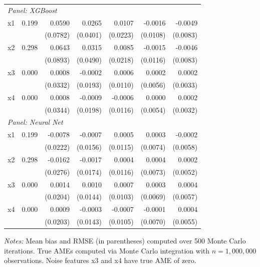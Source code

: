 \documentclass[12pt,a4paper]{article}
\numberwithin{equation}{section}
\theoremstyle{plain}
\theoremstyle{definition}
\begin{document}
\begin{table}[htbp]
\begin{threeparttable}
\begin{tabular}{lrrrrrr}
				\multicolumn{7}{l}{\textit{Panel: XGBoost}} \\
				\quad x1 & 0.199 & 0.0590 & 0.0265 & 0.0107 & -0.0016 & -0.0049 \\
				&  & (0.0782) & (0.0401) & (0.0223) & (0.0108) & (0.0083) \\
				\quad x2 & 0.298 & 0.0643 & 0.0315 & 0.0085 & -0.0015 & -0.0046 \\
				&  & (0.0893) & (0.0490) & (0.0218) & (0.0116) & (0.0083) \\
				\quad x3 & 0.000 & 0.0008 & -0.0002 & 0.0006 & 0.0002 & 0.0002 \\
				&  & (0.0332) & (0.0193) & (0.0110) & (0.0056) & (0.0033) \\
				\quad x4 & 0.000 & 0.0008 & -0.0009 & -0.0006 & 0.0000 & 0.0002 \\
				&  & (0.0344) & (0.0198) & (0.0116) & (0.0054) & (0.0032) \\
				\midrule
				\multicolumn{7}{l}{\textit{Panel: Neural Net}} \\
				\quad x1 & 0.199 & -0.0078 & -0.0007 & 0.0005 & 0.0003 & -0.0002 \\
				&  & (0.0222) & (0.0156) & (0.0115) & (0.0074) & (0.0058) \\
				\quad x2 & 0.298 & -0.0162 & -0.0017 & 0.0004 & 0.0004 & 0.0002 \\
				&  & (0.0276) & (0.0174) & (0.0116) & (0.0073) & (0.0052) \\
				\quad x3 & 0.000 & 0.0014 & 0.0010 & 0.0007 & 0.0003 & 0.0004 \\
				&  & (0.0204) & (0.0144) & (0.0103) & (0.0069) & (0.0057) \\
				\quad x4 & 0.000 & 0.0009 & -0.0003 & -0.0007 & -0.0001 & 0.0004 \\
				&  & (0.0203) & (0.0143) & (0.0105) & (0.0070) & (0.0055) \\
				\bottomrule
				\end{tabular}
				\begin{tablenotes}
				\footnotesize
				\item \textit{Notes:} Mean bias and RMSE (in parentheses) computed over 500 Monte Carlo iterations. True AMEs computed via Monte Carlo integration with $n=1{,}000{,}000$ observations. Noise features x3 and x4 have true AME of zero.
				\end{tablenotes}
		\end{threeparttable}
	\end{table}
	
\end{document}
